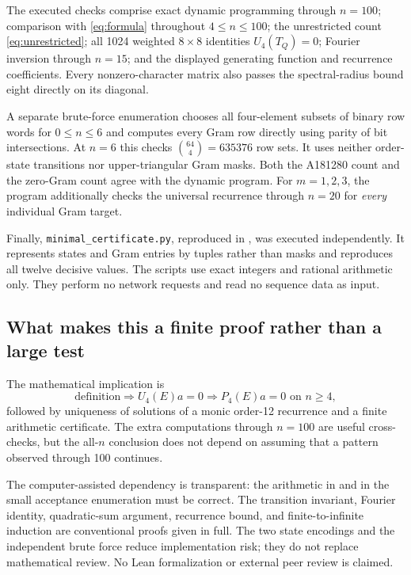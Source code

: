 \documentclass[11pt,letterpaper]{article}
\theoremstyle{definition}
\newcommand{\1}{\mathbf 1}
\begin{document}
The executed checks comprise exact dynamic programming through $n=100$;
comparison with \eqref{eq:formula} throughout $4\le n\le100$; the unrestricted
count \eqref{eq:unrestricted}; all 1024 weighted $8\times8$ identities
$U_4(T_Q)=0$; Fourier inversion through $n=15$; and the displayed generating
function and recurrence coefficients. Every nonzero-character matrix also
passes the spectral-radius bound eight directly on its diagonal.

A separate brute-force enumeration chooses all four-element subsets of binary
row words for $0\le n\le6$ and computes every Gram row directly using parity
of bit intersections. At $n=6$ this checks $\binom{64}{4}=635376$ row sets. It
uses neither order-state transitions nor upper-triangular Gram masks. Both the
A181280 count and the zero-Gram count agree with the dynamic program.
For $m=1,2,3$, the program additionally checks the universal recurrence through
$n=20$ for \emph{every} individual Gram target.

Finally, \texttt{minimal\_certificate.py}, reproduced in , was
executed independently. It represents states and Gram entries by tuples rather
than masks and reproduces all twelve decisive values. The scripts use exact
integers and rational arithmetic only. They perform no network requests and
read no sequence data as input.

\subsection{What makes this a finite proof rather than a large test}
The mathematical implication is
\[
 \text{definition}
 \Longrightarrow U_4(E)a=0
 \Longrightarrow P_4(E)a=0\text{ on }n\ge4,
\]
followed by uniqueness of solutions of a monic order-12 recurrence and a finite
arithmetic certificate. The extra computations through $n=100$ are useful
cross-checks, but the all-$n$ conclusion does not depend on assuming that a
pattern observed through 100 continues.

The computer-assisted dependency is transparent: the arithmetic in
 and in the small acceptance enumeration must be correct.
The transition invariant, Fourier identity, quadratic-sum argument, recurrence
bound, and finite-to-infinite induction are conventional proofs given in full.
The two state encodings and the independent brute force reduce implementation
risk; they do not replace mathematical review. No Lean formalization or
external peer review is claimed.
\end{document}
